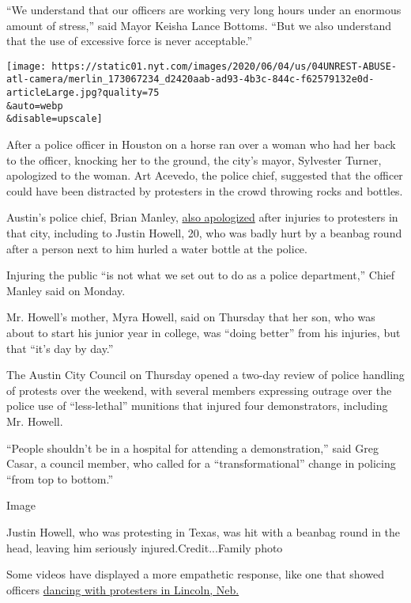 ``We understand that our officers are working very long hours under an
enormous amount of stress,'' said Mayor Keisha Lance Bottoms. ``But we
also understand that the use of excessive force is never acceptable.''

\texttt{[image: https://static01.nyt.com/images/2020/06/04/us/04UNREST-ABUSE-atl-camera/merlin\_173067234\_d2420aab-ad93-4b3c-844c-f62579132e0d-articleLarge.jpg?quality=75\\\&auto=webp\\\&disable=upscale]}

After a police officer in Houston on a horse ran over a woman who had
her back to the officer, knocking her to the ground, the city's mayor,
Sylvester Turner, apologized to the woman. Art Acevedo, the police
chief, suggested that the officer could have been distracted by
protesters in the crowd throwing rocks and bottles.

Austin's police chief, Brian Manley,
\href{https://www.statesman.com/news/20200601/lsquothis-is-not-what-we-set-out-to-dorsquo-chief-says-after-police-injure-some-during-protests}{also
apologized} after injuries to protesters in that city, including to
Justin Howell, 20, who was badly hurt by a beanbag round after a person
next to him hurled a water bottle at the police.

Injuring the public ``is not what we set out to do as a police
department,'' Chief Manley said on Monday.

Mr. Howell's mother, Myra Howell, said on Thursday that her son, who was
about to start his junior year in college, was ``doing better'' from his
injuries, but that ``it's day by day.''

The Austin City Council on Thursday opened a two-day review of police
handling of protests over the weekend, with several members expressing
outrage over the police use of ``less-lethal'' munitions that injured
four demonstrators, including Mr. Howell.

``People shouldn't be in a hospital for attending a demonstration,''
said Greg Casar, a council member, who called for a ``transformational''
change in policing ``from top to bottom.''

Image

Justin Howell, who was protesting in Texas, was hit with a beanbag round
in the head, leaving him seriously injured.Credit...Family photo

Some videos have displayed a more empathetic response, like one that
showed officers
\href{https://publish.twitter.com/?query=https\%3A\%2F\%2Ftwitter.com\%2FRexChapman\%2Fstatus\%2F1268379338019418113\&widget=Tweet}{dancing
with protesters in Lincoln, Neb.}

